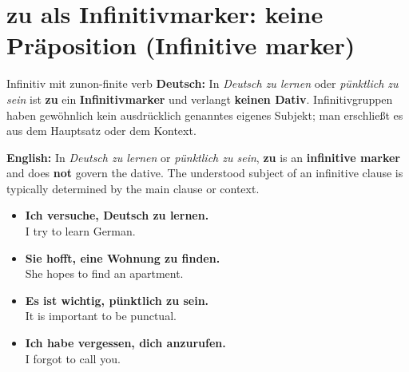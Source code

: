 \documentclass[a4paper,11pt]{article}
\newcommand{\GermanText}[1]{\textbf{Deutsch: }#1\par}
\newcommand{\EnglishText}[1]{{\small\color{SoftGray}\textbf{English: }#1\par}}
\newcommand{\ExampleItem}[2]{\item \textbf{#1}\\{\small\color{SoftGray}#2}}
\begin{document}
\section{zu als Infinitivmarker: keine Präposition (Infinitive marker)}
\begin{grammarentry}{Infinitiv mit zu}{non-finite verb}
\GermanText{In \emph{Deutsch zu lernen} oder \emph{pünktlich zu sein} ist \textbf{zu} ein \textbf{Infinitivmarker} und verlangt \textbf{keinen Dativ}. Infinitivgruppen haben gewöhnlich kein ausdrücklich genanntes eigenes Subjekt; man erschließt es aus dem Hauptsatz oder dem Kontext.}
\EnglishText{In \emph{Deutsch zu lernen} or \emph{pünktlich zu sein}, \textbf{zu} is an \textbf{infinitive marker} and does \textbf{not} govern the dative. The understood subject of an infinitive clause is typically determined by the main clause or context.}
\end{grammarentry}
\begin{exbox}
\begin{itemize}
\ExampleItem{Ich versuche, Deutsch zu lernen.}{I try to learn German.}
\ExampleItem{Sie hofft, eine Wohnung zu finden.}{She hopes to find an apartment.}
\ExampleItem{Es ist wichtig, pünktlich zu sein.}{It is important to be punctual.}
\ExampleItem{Ich habe vergessen, dich anzurufen.}{I forgot to call you.}
\end{itemize}
\end{exbox}
\end{document}

